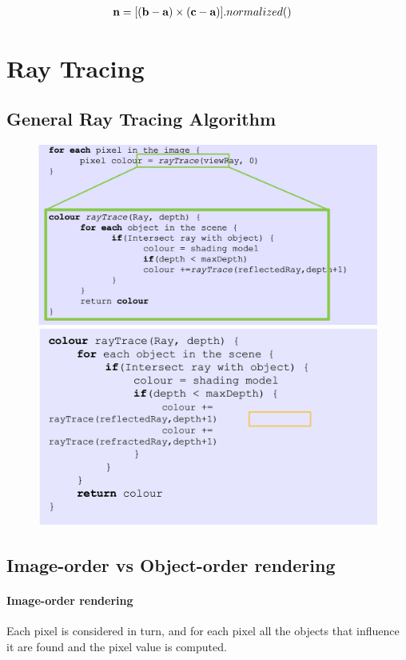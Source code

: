 \documentclass[11pt]{article}
\numberwithin{equation}{section}
\begin{document}
\begin{align}
	\textbf{n} &= [(\textbf{b} - \textbf{a}) \times (\textbf{c} - \textbf{a})].normalized()
\end{align}



\section{Ray Tracing}
\subsection{General Ray Tracing Algorithm}
	\begin{figure}[H]
	\centering
	\includegraphics[scale=0.4]{p34}
	\includegraphics[scale=0.3]{p35}
	\end{figure}
\subsection{Image-order vs Object-order rendering}
\paragraph{Image-order rendering}
Each pixel is considered in turn, and for each pixel all the objects that influence it are found and the pixel value is computed.\\
\end{document}
